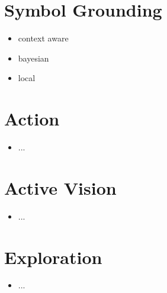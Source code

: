 \documentclass{article}
\begin{document}
	\section{Symbol Grounding}
	
	\begin{itemize}
		\item context aware
		\item bayesian
		\item local
	\end{itemize}
	
	\section{Action}
	
	\begin{itemize}
		\item ...
	\end{itemize}
	
	\section{Active Vision}
	
	\begin{itemize}
		\item ...
	\end{itemize}
	
	\section{Exploration}
	
	\begin{itemize}
		\item ...
	\end{itemize}
		
	\clearpage
	
	
	
	\clearpage
	
	
	
	
\end{document}
